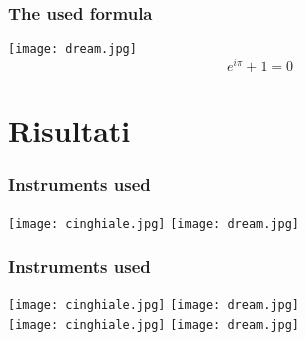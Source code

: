 \documentclass{beamer}
\begin{document}
\begin{frame}
\frametitle{The used formula}
\centering
\texttt{[image: dream.jpg]}\\
\begin{equation}
e^{i \pi} + 1 = 0
\end{equation}
\end{frame}



\section{Risultati}

\begin{frame}
\frametitle{Instruments used}
\centering
\texttt{[image: cinghiale.jpg]} 
\texttt{[image: dream.jpg]}
\end{frame}


\begin{frame}
\frametitle{Instruments used}
\centering
\texttt{[image: cinghiale.jpg]} 
\texttt{[image: dream.jpg]} \\ %
\bigskip %
\texttt{[image: cinghiale.jpg]} 
\texttt{[image: dream.jpg]}
\end{frame}
\end{document}
